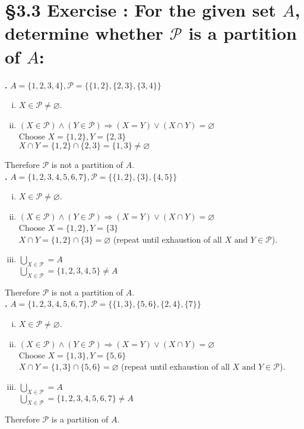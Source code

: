 \documentclass[a4paper,11pt]{article}
\begin{document}
\section*{\S 3.3 Exercise : For the given set \(A\), determine whether \(\mathscr{P}\) is a partition of \(A\):}
\setcounter{SubsectionCounter}{1}
\textbf{.}
\(A = \{1,2,3,4\}, \mathscr{P} = \{\{1,2\},\{2,3\},\{3,4\}\}\)
\begin{enumerate}[(i)]
  \item \(X \in \mathscr{P} \neq \varnothing\).\\
  \item \({(X \in \mathscr{P})} \wedge {(Y \in \mathscr{P})} \Rightarrow {(X = Y)} \vee {(X \cap Y)} = 
  \varnothing\)\\
  Choose \(X = \{1,2\}, Y=\{2,3\}\)\\
  \(X \cap Y = \{1,2\} \cap \{2,3\} = \{1,3\} \neq \varnothing\)
\end{enumerate}
Therefore \(\mathscr{P}\) is not a partition of \(A\).\\
\setcounter{SubsectionCounter}{2}
\textbf{.}
\(A = \{1,2,3,4,5,6,7\}, \mathscr{P} = \{\{1,2\},\{3\},\{4,5\}\}\)
\begin{enumerate}[(i)]
  \item \(X \in \mathscr{P} \neq \varnothing\).
  \item \({(X \in \mathscr{P})} \wedge {(Y \in \mathscr{P})} \Rightarrow {(X = Y)} \vee {(X \cap Y)} = 
  \varnothing\)\\
  Choose \(X = \{1,2\}, Y=\{3\}\)\\
  \(X \cap Y = \{1,2\} \cap \{3\} = \varnothing\) {(repeat until exhaustion of all \(X \text{ and } Y \in \mathscr{P}\))}.
  \item \(\bigcup\limits_{X \in \mathscr{P}} = A\)\\
  \(\bigcup\limits_{X \in \mathscr{P}} = \{1,2,3,4,5\} \neq A\)
\end{enumerate}
Therefore \(\mathscr{P}\) is not a partition of \(A\).\\
\newpage
\setcounter{SubsectionCounter}{2}
\textbf{.}
\(A = \{1,2,3,4,5,6,7\}, \mathscr{P} = \{\{1,3\},\{5,6\},\{2,4\},\{7\}\}\)
\begin{enumerate}[(i)]
  \item \(X \in \mathscr{P} \neq \varnothing\).
  \item \({(X \in \mathscr{P})} \wedge {(Y \in \mathscr{P})} \Rightarrow {(X = Y)} \vee {(X \cap Y)} = 
  \varnothing\)\\
  Choose \(X = \{1,3\}, Y=\{5,6\}\)\\
  \(X \cap Y = \{1,3\} \cap \{5,6\} = \varnothing\) {(repeat until exhaustion of all \(X \text{ and } Y \in \mathscr{P}\))}.
  \item \(\bigcup\limits_{X \in \mathscr{P}} = A\)\\
  \(\bigcup\limits_{X \in \mathscr{P}} = \{1,2,3,4,5,6,7\} \neq A\)
\end{enumerate}
Therefore \(\mathscr{P}\) is a partition of \(A\).
\newpage
\setcounter{ProblemCounter}{8}
\end{document}
